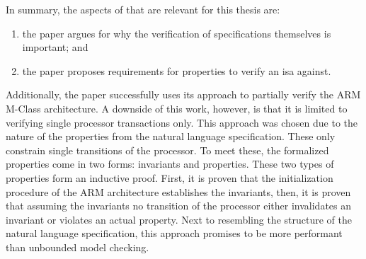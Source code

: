 In summary, the aspects of \cite{Reid17} that are relevant for this thesis are:
\begin{enumerate}[label=\alph*)]
    \item the paper argues for why the verification of specifications themselves is important; and
    \item the paper proposes requirements for properties to verify an \gls{isa} against.
\end{enumerate}

Additionally, the paper successfully uses its approach to partially verify the ARM M-Class architecture.
A downside of this work, however, is that it is limited to verifying single processor transactions only.
This approach was chosen due to the nature of the properties from the natural language specification.
These only constrain single transitions of the processor.
To meet these, the formalized properties come in two forms: invariants and properties.
These two types of properties form an inductive proof.
First, it is proven that the initialization procedure of the ARM architecture establishes the invariants, then, it is proven that assuming the invariants no transition of the processor either invalidates an invariant or violates an actual property.
Next to resembling the structure of the natural language specification, this approach promises to be more performant than unbounded model checking.

